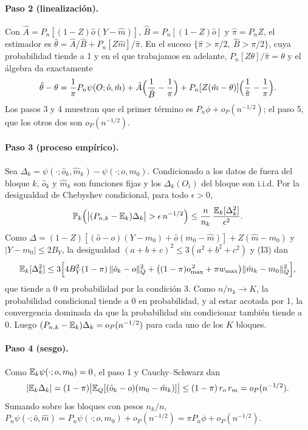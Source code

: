 \paragraph{Paso 2 (linealización).} Con $\hat A=P_n[(1-Z)\hat o(Y-\hat m)]$, $\hat B=P_n[(1-Z)\hat o]$ y $\hat\pi=P_nZ$, el estimador es $\hat\theta=\hat A/\hat B+P_n[Z\hat m]/\hat\pi$. En el suceso $\{\hat\pi>\pi/2,\ \hat B>\pi/2\}$, cuya probabilidad tiende a 1 y en el que trabajamos en adelante, $P_n[Z\theta]/\hat\pi=\theta$ y el álgebra da exactamente
\[
\hat\theta-\theta=\frac1\pi P_n\psi(O;\hat o,\hat m)+\hat A\Bigl(\frac1{\hat B}-\frac1\pi\Bigr)+P_n[Z(\hat m-\theta)]\Bigl(\frac1{\hat\pi}-\frac1\pi\Bigr).
\]
Los pasos 3 y 4 muestran que el primer término es $P_n\phi+o_P(n^{-1/2})$; el paso 5, que los otros dos son $o_P(n^{-1/2})$.

\paragraph{Paso 3 (proceso empírico).} Sea $\Delta_k=\psi(\cdot;\hat o_k,\hat m_k)-\psi(\cdot;o,m_0)$. Condicionado a los datos de fuera del bloque $k$, $\hat o_k$ y $\hat m_k$ son funciones fijas y los $\Delta_k(O_i)$ del bloque son i.i.d. Por la desigualdad de Chebyshev condicional, para todo $\epsilon>0$,
\[
\PP_k\Bigl(\bigl|(P_{n,k}-\E_k)\Delta_k\bigr|>\epsilon\,n^{-1/2}\Bigr)\le\frac{n}{n_k}\,\frac{\E_k[\Delta_k^2]}{\epsilon^2}.
\]
Como $\Delta=(1-Z)[(\hat o-o)(Y-m_0)+\hat o(m_0-\hat m)]+Z(\hat m-m_0)$ y $|Y-m_0|\le2B_Y$, la desigualdad $(a+b+c)^2\le3(a^2+b^2+c^2)$ y (I3) dan
\[
\mathbb{E}_k[\Delta_k^2]\le3\Bigl[4B_Y^2(1-\pi)\,\|\hat o_k-o\|_Q^2+\bigl((1-\pi)o_{\max}^{\,2}+\pi w_{\max}\bigr)\|\hat m_k-m_0\|_Q^2\Bigr],
\]
que tiende a 0 en probabilidad por la condición 3. Como $n/n_k\to K$, la probabilidad condicional tiende a 0 en probabilidad, y al estar acotada por 1, la convergencia dominada da que la probabilidad sin condicionar también tiende a 0. Luego $(P_{n,k}-\mathbb{E}_k)\Delta_k=o_P(n^{-1/2})$ para cada uno de los $K$ bloques.

\paragraph{Paso 4 (sesgo).} Como $\mathbb{E}_k\psi(\cdot;o,m_0)=0$, el paso 1 y Cauchy--Schwarz dan
\[
|\mathbb{E}_k\Delta_k|=(1-\pi)\bigl|\mathbb{E}_Q[(\hat o_k-o)(m_0-\hat m_k)]\bigr|\le(1-\pi)\,r_o\,r_m=o_P(n^{-1/2}).
\]
Sumando sobre los bloques con pesos $n_k/n$, $P_n\psi(\cdot;\hat o,\hat m)=P_n\psi(\cdot;o,m_0)+o_P(n^{-1/2})=\pi P_n\phi+o_P(n^{-1/2})$.

